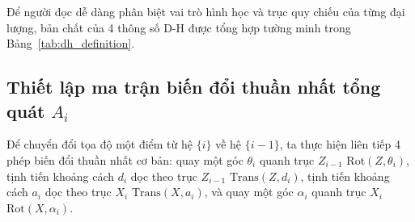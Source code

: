 Để người đọc dễ dàng phân biệt vai trò hình học và trục quy chiếu của từng đại lượng, bản chất của 4 thông số D-H được tổng hợp tường minh trong Bảng~\ref{tab:dh_definition}.

\begin{table}[htbp]
\centering
\caption{Bản chất và quy ước đo lường của 4 thông số Denavit - Hartenberg}
\label{tab:dh_definition}
\end{table}

\subsection{Thiết lập ma trận biến đổi thuần nhất tổng quát $A_i$}

Để chuyển đổi tọa độ một điểm từ hệ $\{i\}$ về hệ $\{i-1\}$, ta thực hiện liên tiếp 4 phép biến đổi thuần nhất cơ bản: quay một góc $\theta_i$ quanh trục $Z_{i-1}$ $\text{Rot}(Z, \theta_i)$, tịnh tiến khoảng cách $d_i$ dọc theo trục $Z_{i-1}$ $\text{Trans}(Z, d_i)$, tịnh tiến khoảng cách $a_i$ dọc theo trục $X_i$ $\text{Trans}(X, a_i)$, và quay một góc $\alpha_i$ quanh trục $X_i$ $\text{Rot}(X, \alpha_i)$.

